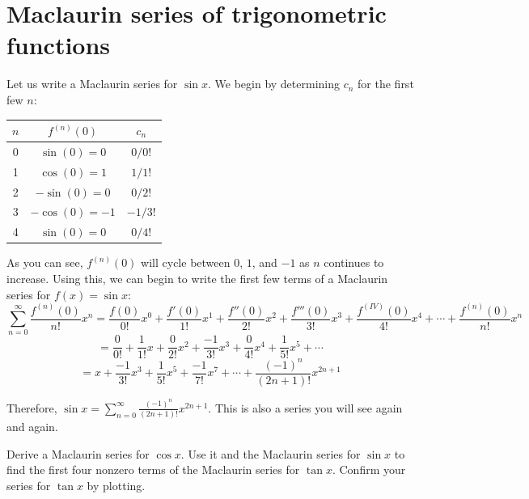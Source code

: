 \section{Maclaurin series of trigonometric functions}
Let us write a Maclaurin series for $\sin{x}$. We begin by determining $c_n$ 
for the first few $n$:
\begin{center}
	\begin{tabular}{|c|c|c|}\hline
	$n$ & $f^{(n)}(0)$ & $c_n$\\\hline
	0 & $\sin{(0)} = 0$ & $0/0!$\\\hline
	1 & $\cos{(0)} = 1$ & $1/1!$\\\hline
	2 & $-\sin{(0)} = 0$ & $0/2!$\\\hline
	3 & $-\cos{(0)} = -1$ & $-1/3!$\\\hline
	4 & $\sin{(0)} = 0$ & $0/4!$\\\hline
	\end{tabular}
\end{center}
As you can see, $f^{(n)}(0)$ will cycle between $0$, $1$, and $-1$ as $n$ 
continues to increase. Using this, we can begin to write the first few terms 
of a Maclaurin series for $f(x) = \sin{x}$:
$$\sum_{n=0}^\infty \frac{f^{(n)}(0)}{n!}x^n = \frac{f(0)}{0!}x^0 + \frac{f'(0)
}{1!}x^1 + \frac{f''(0)}{2!}x^2 + \frac{f'''(0)}{3!}x^3 + \frac{f^{(IV)}(0)}{4!
}x^4 + \cdots + \frac{f^{(n)}(0)}{n!}x^n$$
$$= \frac{0}{0!} + \frac{1}{1!}x + \frac{0}{2!}x^2 + \frac{-1}{3!}x^3 + \frac{0
}{4!}x^4 + \frac{1}{5!}x^5 + \cdots$$
$$=x + \frac{-1}{3!}x^3 + \frac{1}{5!}x^5 + \frac{-1}{7!}x^7 + \cdots + \frac{(
-1)^n}{(2n + 1)!}x^{2n+1}$$

Therefore, $\sin{x} = \sum_{n=0}^\infty \frac{(-1)^n}{(2n + 1)!}x^{2n + 1}$. 
This is also a series you will see again and again. 

\begin{Exercise}[label=trigmac]
Derive a Maclaurin series for $\cos{x}$. Use it and the Maclaurin series for 
$\sin{x}$ to find the first four nonzero terms of the Maclaurin series for $\tan{x}$. Confirm 
your series for $\tan{x}$ by plotting. 
\end{Exercise}


